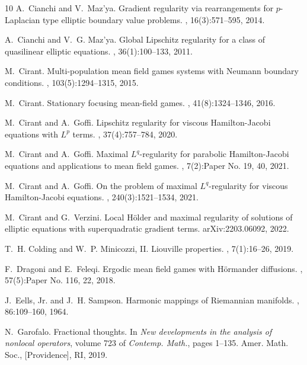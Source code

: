 \documentclass[10pt, a4paper, reqno, oneside]{amsart}
\theoremstyle{plain}
\theoremstyle{definition}
\theoremstyle{plain}
\theoremstyle{definition}
\theoremstyle{plain}
\renewcommand{\=}{:=}
\begin{document}
\begin{thebibliography}{10}
A.~Cianchi and V.~Maz'ya.
\newblock Gradient regularity via rearrangements for {$p$}-{L}aplacian type
  elliptic boundary value problems.
, 16(3):571--595, 2014.

A.~Cianchi and V.~G. Maz'ya.
\newblock Global {L}ipschitz regularity for a class of quasilinear elliptic
  equations.
, 36(1):100--133, 2011.

M.~Cirant.
\newblock Multi-population mean field games systems with {N}eumann boundary
  conditions.
, 103(5):1294--1315, 2015.

M.~Cirant.
\newblock Stationary focusing mean-field games.
, 41(8):1324--1346, 2016.

M.~Cirant and A.~Goffi.
\newblock Lipschitz regularity for viscous {H}amilton-{J}acobi equations with
  {$L^p$} terms.
,
  37(4):757--784, 2020.

M.~Cirant and A.~Goffi.
\newblock Maximal {$L^q$}-regularity for parabolic {H}amilton-{J}acobi
  equations and applications to mean field games.
, 7(2):Paper No. 19, 40, 2021.

M.~Cirant and A.~Goffi.
\newblock On the problem of maximal {$L^q$}-regularity for viscous
  {H}amilton-{J}acobi equations.
, 240(3):1521--1534, 2021.

M.~Cirant and G.~Verzini.
\newblock Local {H}\"older and maximal regularity of solutions of elliptic
  equations with superquadratic gradient terms.
\newblock arXiv:2203.06092, 2022.

T.~H. Colding and W.~P. Minicozzi, II.
\newblock Liouville properties.
, 7(1):16--26, 2019.

F.~Dragoni and E.~Feleqi.
\newblock Ergodic mean field games with {H}\"{o}rmander diffusions.
, 57(5):Paper No. 116,
  22, 2018.

J.~Eells, Jr. and J.~H. Sampson.
\newblock Harmonic mappings of {R}iemannian manifolds.
, 86:109--160, 1964.

N.~Garofalo.
\newblock Fractional thoughts.
\newblock In {\em New developments in the analysis of nonlocal operators},
  volume 723 of {\em Contemp. Math.}, pages 1--135. Amer. Math. Soc.,
  [Providence], RI, 2019.


\end{thebibliography}
\end{document}
